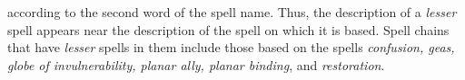 

according to the second word of the spell name. Thus, the description of a \textit{lesser
}spell appears near the description of the spell on which it is based. Spell chains
that have \textit{lesser} spells in them include those based on the spells \textit{confusion,
geas, globe of invulnerability, planar ally, planar binding}, and \textit{restoration}.